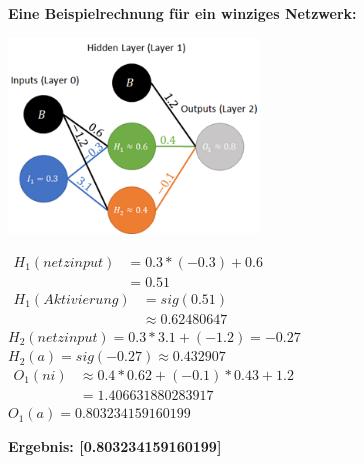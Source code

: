 \documentclass[11pt, a4paper, ngerman]{article}
\begin{document}
		\begin{minipage}{\textwidth}
		\textbf{Eine Beispielrechnung für ein winziges Netzwerk:}%
			\begin{multicols}{2}
				\begingroup
				\includegraphics[width=0.5\textwidth]{"pictures/bsp_net_small.png"}
				\endgroup
			\columnbreak
				\begin{flushleft}
					$
					\begin{aligned}
						H_1(netzinput) & = 0.3 * (-0.3) + 0.6\\
						& = 0.51
					\end{aligned}
					$\\[2ex]
					$
					\begin{aligned}
						H_1(Aktivierung) & = sig(0.51)\\
						& \approx0.62480647				
					\end{aligned}
					$\\[2ex]
					$H_2(netzinput)=0.3*3.1+(-1.2)=-0.27$\\[2ex]
					$H_2(a)=sig(-0.27)\approx0.432907$\\[2ex]
					$
					\begin{aligned}
						O_1(ni)& \approx0.4*0.62+(-0.1)*0.43+1.2\\
						& =1.406631880283917
					\end{aligned}
					$\\[2ex]
					$O_1(a)=0.803234159160199$
				\end{flushleft}
				\textbf{Ergebnis: [0.803234159160199]}
				\vfill
				\phantom{o}
			\end{multicols}
		\end{minipage}\\[1.25ex]
		
\end{document}
